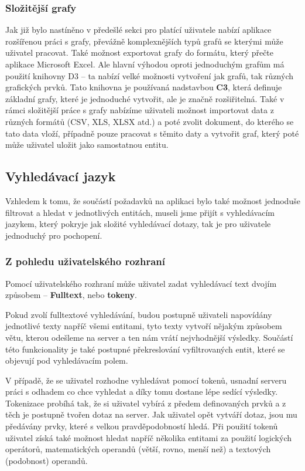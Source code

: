 \subsubsection{Složitější grafy}
\par Jak již bylo nastíněno v předešlé sekci pro platící uživatele nabízí aplikace rozšířenou práci s grafy, převážně komplexnějších typů grafů se kterými může uživatel pracovat. Také možnost exportovat grafy do formátu, který přečte aplikace Microsoft Excel. Ale hlavní výhodou oproti jednoduchým grafům má použití knihovny D3 -- ta nabízí velké možnosti vytvoření jak grafů, tak různých grafických prvků. Tato knihovna je používaná nadstavbou \textbf{C3}, která definuje základní grafy, které je jednoduché vytvořit, ale je značně rozšiřitelná. Také v rámci složitější práce s grafy nabízíme uživateli možnost importovat data z různých formátů (CSV, XLS, XLSX atd.) a poté zvolit dokument, do kterého se tato data vloží, případně pouze pracovat s těmito daty a vytvořit graf, který poté může uživatel uložit jako samostatnou entitu.

\subsection{Vyhledávací jazyk}
\par Vzhledem k tomu, že součástí požadavků na aplikaci bylo také možnost jednoduše filtrovat a hledat v jednotlivých entitách, museli jsme přijít s vyhledávacím jazykem, který pokryje jak složité vyhledávací dotazy, tak je pro uživatele jednoduchý pro pochopení.

\subsubsection{Z pohledu uživatelského rozhraní}
\par Pomocí uživatelského rozhraní může uživatel zadat vyhledávací text dvojím způsobem -- \textbf{Fulltext}, nebo \textbf{tokeny}.

\par Pokud zvolí fulltextové vyhledávání, budou postupně uživateli napovídány jednotlivé texty napříč všemi entitami, tyto texty vytvoří nějakým způsobem větu, kterou odešleme na server a ten nám vrátí nejvhodnější výsledky. Součástí této funkcionality je také postupné překreslování vyfiltrovaných entit, které se objevují pod vyhledávacím polem.

\par V případě, že se uživatel rozhodne vyhledávat pomocí tokenů, usnadní serveru práci s odhadem co chce vyhledat a díky tomu dostane lépe sedící výsledky. Tokenizace probíhá tak, že si uživatel vybírá z předem definovaných prvků a z těch je postupně tvořen dotaz na server. Jak uživatel opět vytváří dotaz, jsou mu předávány prvky, které s velkou pravděpodobností hledá. Při použití tokenů uživatel získá také možnost hledat napříč několika entitami za použití logických operátorů, matematických operandů (větší, rovno, menší než) a textových (podobnost) operandů.

